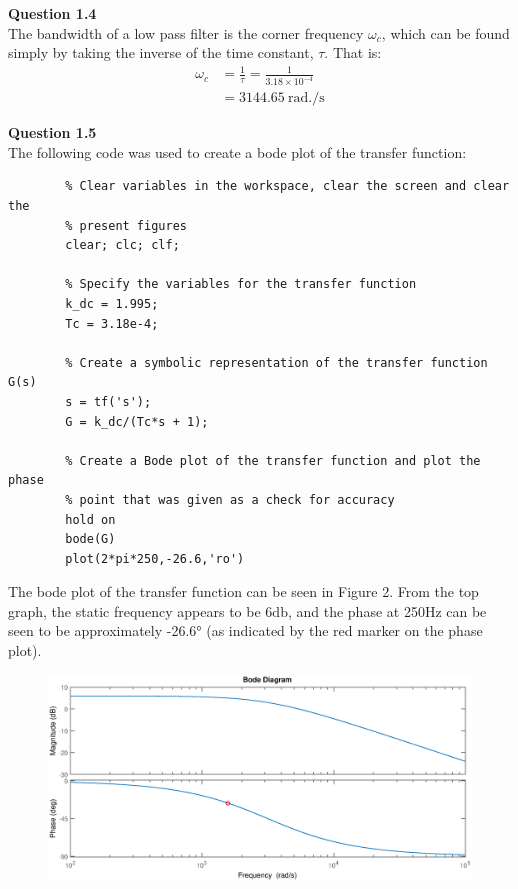 \documentclass{article}
\begin{document}
    
    \textbf{Question 1.4}\\
    
    The bandwidth of a low pass filter is the corner frequency $\omega_c$, which can be found simply by taking the inverse of the time constant, $\tau$. That is:
    \begin{align*}
	    \omega_c 	&= \frac{1}{\tau} = \frac{1}{3.18 \times 10^{-4}}\\
				    &= 3144.65 \ \si{\radian.\per\second}
    \end{align*}
    	






    
    \textbf{Question 1.5}\\
    
    The following code was used to create a bode plot of the transfer function:
    
    \begin{lstlisting}
	    % Clear variables in the workspace, clear the screen and clear the
	    % present figures
	    clear; clc; clf;
	    
	    % Specify the variables for the transfer function
	    k_dc = 1.995;
	    Tc = 3.18e-4;
	    
	    % Create a symbolic representation of the transfer function G(s)
	    s = tf('s');
	    G = k_dc/(Tc*s + 1);
	    
	    % Create a Bode plot of the transfer function and plot the phase
	    % point that was given as a check for accuracy
	    hold on
	    bode(G)
	    plot(2*pi*250,-26.6,'ro')
    \end{lstlisting}
    
    The bode plot of the transfer function can be seen in Figure 2. From the top graph, the static frequency appears to be 6$\si{\decibel}$, and the phase at 250$\si{\hertz}$ can be seen to be approximately -26.6$\si{\degree}$ (as indicated by the red marker on the phase plot).
    
    \begin{figure}[H]
    	\includegraphics[scale=0.6]{fig2.eps}
    \end{figure}
    
\end{document}
